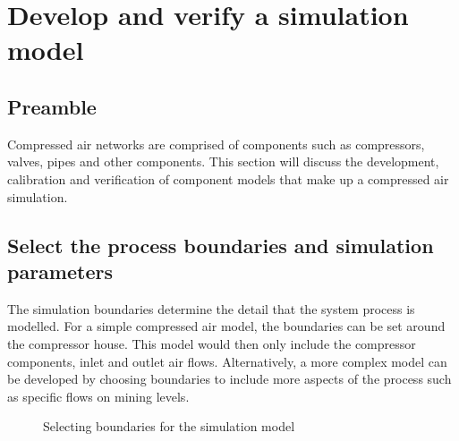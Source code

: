 \section{Develop and verify a simulation model}
	\subsection{Preamble}
	Compressed air networks are comprised of components such as compressors, valves, pipes and other components. This section will discuss the development, calibration and verification of component models that make up a compressed air simulation. 
	
	\subsection{Select the process boundaries and simulation parameters}
	The simulation boundaries determine the detail that the system process is modelled. For a simple compressed air model, the boundaries can be set around the compressor house. This model would then only include the compressor components, inlet and outlet air flows. Alternatively, a more complex model can be developed by choosing boundaries to include more aspects of the process such as specific flows on mining levels.
	
	 \begin{figure}[h]
	 	\centering
	 	\caption{ Selecting boundaries for the simulation model}
	 	\label{fig: Sensitivity}
	 \end{figure}
 
